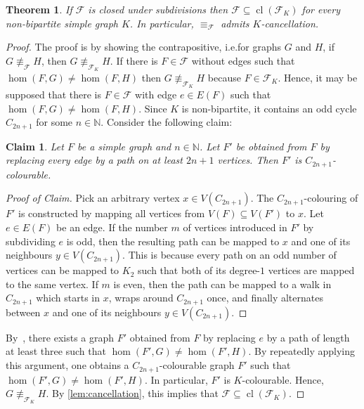 \documentclass[3p,final]{elsarticle}
\DeclareMathOperator{\cl}{cl}
\newtheorem{theorem}{Theorem}
\newtheorem{claim}{Claim}[theorem]
\newenvironment{claimproof}[1][Proof of Claim]{\begin{proof}[#1] \renewcommand{\qedsymbol}{$\lrcorner$}}{ \end{proof}}
\begin{document}
	\begin{theorem} \label{prop:subdiv}
		If $\mathcal{F}$ is closed under subdivisions then $\mathcal{F} \subseteq \cl(\mathcal{F}_{K})$ for every non-bipartite simple graph $K$.
		In particular, $\equiv_{\mathcal{F}}$ admits $K$-cancellation.
	\end{theorem}
	\begin{proof}
		The proof is by showing the contrapositive, i.e.\@ for graphs $G$ and $H$, if $G \not\equiv_{\mathcal{F}} H$,  then $G \not\equiv_{\mathcal{F}_K} H$.
		If there is $F \in \mathcal{F}$ without edges such that $\hom(F, G) \neq \hom(F, H)$ then $G \not\equiv_{\mathcal{F}_K} H$ because $F \in \mathcal{F}_K$.
		Hence, it may be supposed that there is $F \in \mathcal{F}$ with edge $e \in E(F)$ such that $\hom(F, G) \neq \hom(F, H)$.
		Since $K$ is non-bipartite, it contains an odd cycle $C_{2n+1}$ for some $n \in \mathbb{N}$.
		Consider the following claim:	
		
		\begin{claim}
			Let $F$ be a simple graph and $n \in \mathbb{N}$.
			Let $F'$ be obtained from $F$ by replacing every edge by a path on at least $2n+1$ vertices.
			Then $F'$ is $C_{2n+1}$-colourable.
		\end{claim}
		\begin{claimproof}
			Pick an arbitrary vertex $x \in V(C_{2n+1})$.
			The $C_{2n+1}$-colouring of $F'$ is constructed by mapping all vertices from $V(F) \subseteq V(F')$ to $x$.
			Let $e \in E(F)$ be an edge.
			If the number $m$ of vertices introduced in $F'$ by subdividing $e$ is odd,
			then the resulting path can be mapped to $x$ and one of its neighbours $y \in V(C_{2n+1})$.
			This is because every path on an odd number of vertices can be mapped to $K_2$ such that both of its degree-$1$ vertices are mapped to the same vertex.
			If $m$ is even,
			then the path can be mapped to a walk in $C_{2n+1}$ which starts in $x$, wraps around $C_{2n+1}$ once, and finally alternates between $x$ and one of its neighbours $y \in V(C_{2n+1})$.
		\end{claimproof}
		
		By~\cite[Lemma~11]{dvorak_recognizing_2010}, there exists a graph $F'$ obtained from $F$ by replacing $e$ by a path of length at least three such that $\hom(F', G) \neq \hom(F', H)$.
		By repeatedly applying this argument, one obtains a $C_{2n+1}$\nobreakdash-colourable graph $F'$ such that $\hom(F', G) \neq \hom(F', H)$.
		In particular, $F'$ is $K$\nobreakdash-colourable.
		Hence, $G \not\equiv_{\mathcal{F}_K} H$. 
		By \cref{lem:cancellation}, this implies that $\mathcal{F} \subseteq \cl(\mathcal{F}_K)$.
	\end{proof}
\end{document}
